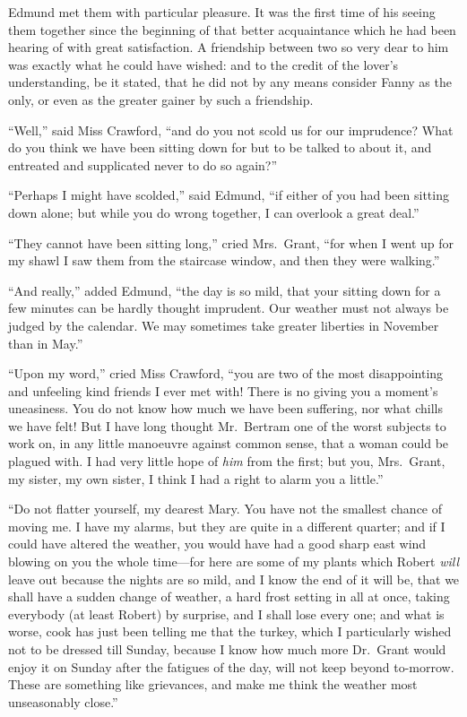 Edmund met them with particular pleasure.  It was the
first time of his seeing them together since the beginning
of that better acquaintance which he had been hearing
of with great satisfaction.  A friendship between two so
very dear to him was exactly what he could have wished:
and to the credit of the lover's understanding, be it stated,
that he did not by any means consider Fanny as the only,
or even as the greater gainer by such a friendship.

``Well,'' said Miss Crawford, ``and do you not scold us for
our imprudence?  What do you think we have been sitting
down for but to be talked to about it, and entreated
and supplicated never to do so again?''

``Perhaps I might have scolded,'' said Edmund, ``if either
of you had been sitting down alone; but while you
do wrong together, I can overlook a great deal.''

``They cannot have been sitting long,'' cried Mrs.\ Grant,
``for when I went up for my shawl I saw them from the
staircase window, and then they were walking.''

``And really,'' added Edmund, ``the day is so mild,
that your sitting down for a few minutes can be hardly
thought imprudent.  Our weather must not always be judged
by the calendar.  We may sometimes take greater liberties
in November than in May.''

``Upon my word,'' cried Miss Crawford, ``you are two of the most
disappointing and unfeeling kind friends I ever met with!
There is no giving you a moment's uneasiness.  You do not
know how much we have been suffering, nor what chills
we have felt!  But I have long thought Mr.\ Bertram one
of the worst subjects to work on, in any little manoeuvre
against common sense, that a woman could be plagued with.
I had very little hope of \emph{him} from the first; but you,
Mrs.\ Grant, my sister, my own sister, I think I had a right
to alarm you a little.''

``Do not flatter yourself, my dearest Mary.  You have not
the smallest chance of moving me.  I have my alarms,
but they are quite in a different quarter; and if I could
have altered the weather, you would have had a good sharp
east wind blowing on you the whole time---for here are
some of my plants which Robert \emph{will} leave out because
the nights are so mild, and I know the end of it will be,
that we shall have a sudden change of weather, a hard frost
setting in all at once, taking everybody (at least Robert)
by surprise, and I shall lose every one; and what is worse,
cook has just been telling me that the turkey, which I
particularly wished not to be dressed till Sunday,
because I know how much more Dr.\ Grant would enjoy it
on Sunday after the fatigues of the day, will not keep
beyond to-morrow. These are something like grievances,
and make me think the weather most unseasonably close.''

